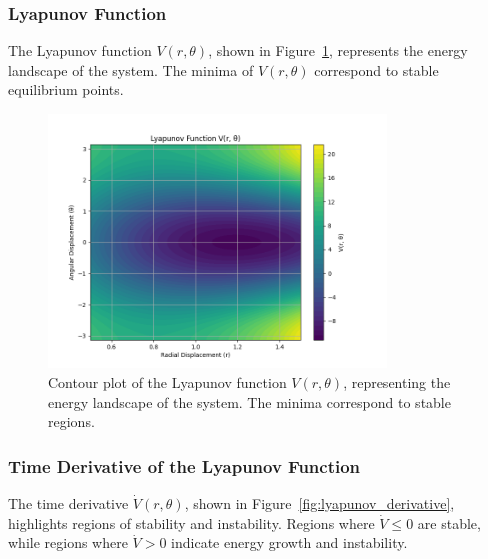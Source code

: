 \documentclass[12pt]{article}
\begin{document}
\subsubsection{Lyapunov Function}
The Lyapunov function \( V(r, \theta) \), shown in Figure~\ref{fig:lyapunov_function}, represents the energy landscape of the system. The minima of \( V(r, \theta) \) correspond to stable equilibrium points.

\begin{figure}[h!]
    \centering
    \includegraphics[width=0.8\textwidth]{lyapunov_function.png}
    \caption{Contour plot of the Lyapunov function \( V(r, \theta) \), representing the energy landscape of the system. The minima correspond to stable regions.}
    \label{fig:lyapunov_function}
\end{figure}

\subsubsection{Time Derivative of the Lyapunov Function}
The time derivative \( \dot{V}(r, \theta) \), shown in Figure~\ref{fig:lyapunov_derivative}, highlights regions of stability and instability. Regions where \( \dot{V} \leq 0 \) are stable, while regions where \( \dot{V} > 0 \) indicate energy growth and instability.
\end{document}

